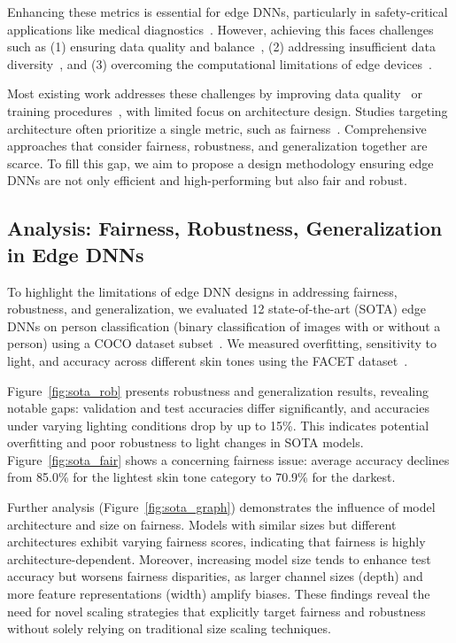 Enhancing these metrics is essential for edge DNNs, particularly in safety-critical applications like medical diagnostics~\cite{esteva2021deep}. However, achieving this faces challenges such as (1) ensuring data quality and balance~\cite{mehrabi2021survey}, (2) addressing insufficient data diversity~\cite{recht2019imagenet}, and (3) overcoming the computational limitations of edge devices~\cite{ibrahim2022robustness, feuerriegel2020fair, hickey2021fairness}.

Most existing work addresses these challenges by improving data quality~\cite{pitoura2020social} or training procedures~\cite{jain2024fairness}, with limited focus on architecture design. Studies targeting architecture often prioritize a single metric, such as fairness~\cite{sheng2022larger}. Comprehensive approaches that consider fairness, robustness, and generalization together are scarce. To fill this gap, we aim to propose a design methodology ensuring edge DNNs are not only efficient and high-performing but also fair and robust.



\subsection{Analysis: Fairness, Robustness, Generalization in Edge DNNs} \label{intro:pre-analysis}
To highlight the limitations of edge DNN designs in addressing fairness, robustness, and generalization, we evaluated 12 state-of-the-art (SOTA) edge DNNs on person classification (binary classification of images with or without a person) using a COCO dataset subset~\cite{lin2014microsoft}. We measured overfitting, sensitivity to light, and accuracy across different skin tones using the FACET dataset~\cite{gustafson2023facet}.

Figure~\ref{fig:sota_rob} presents robustness and generalization results, revealing notable gaps: validation and test accuracies differ significantly, and accuracies under varying lighting conditions drop by up to 15\%. This indicates potential overfitting and poor robustness to light changes in SOTA models. Figure~\ref{fig:sota_fair} shows a concerning fairness issue: average accuracy declines from 85.0\% for the lightest skin tone category to 70.9\% for the darkest.

Further analysis (Figure~\ref{fig:sota_graph}) demonstrates the influence of model architecture and size on fairness. Models with similar sizes but different architectures exhibit varying fairness scores, indicating that fairness is highly architecture-dependent. Moreover, increasing model size tends to enhance test accuracy but worsens fairness disparities, as larger channel sizes (depth) and more feature representations (width) amplify biases. These findings reveal the need for novel scaling strategies that explicitly target fairness and robustness without solely relying on traditional size scaling techniques.

